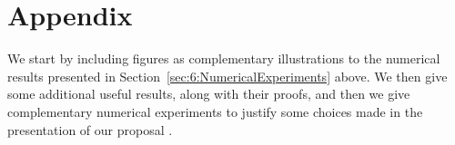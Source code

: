 
\minitoc

\newpage










\newpage
\section{Appendix}
\label{sec:6:appendix}

We start by including figures as complementary illustrations to the numerical results presented in Section~\ref{sec:6:NumericalExperiments} above.
We then give some additional useful results, along with their proofs, and then we give complementary numerical experiments to justify some choices made in the presentation of our proposal \GLRklUCB.


